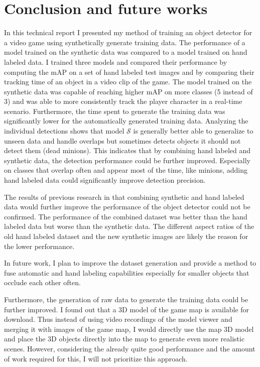 \section{Conclusion and future works}
In this technical report I presented my method of training an object detector for a video game using synthetically generate training data.
The performance of a model trained on the synthetic data was compared to a model trained on hand labeled data.
I trained three models and compared their performance by computing the mAP on a set of hand labeled test images and by comparing their tracking time of an object in a video clip of the game.
The model trained on the synthetic data was capable of reaching higher mAP on more classes (5 instead of 3) and was able to more consistently track the player character in a real-time scenario.
Furthermore, the time spent to generate the training data was significantly lower for the automatically generated training data.
Analyzing the individual detections shows that model $\mathcal{S}$ is generally better able to generalize to unseen data and handle overlaps but sometimes detects objects it should not detect them (dead minions).
This indicates that by combining hand labeled and synthetic data, the detection performance could be further improved.
Especially on classes that overlap often and appear most of the time, like minions, adding hand labeled data could significantly improve detection precision.

The results of previous research in \cite{rajpura2017object} that combining synthetic and hand labeled data would further improve the performance of the object detector could not be confirmed. The performance of the combined dataset was better than the hand labeled data but worse than the synthetic data. The different aspect ratios of the old hand labeled dataset and the new synthetic images are likely the reason for the lower performance.

In future work, I plan to improve the dataset generation and provide a method to fuse automatic and hand labeling capabilities especially for smaller objects that occlude each other often.


Furthermore, the generation of raw data to generate the training data could be further improved.
I found out that a 3D model of the game map is available for download.
Thus instead of using video recordings of the model viewer and merging it with images of the game map, I would directly use the map 3D model and place the 3D objects directly into the map to generate even more realistic scenes.
However, considering the already quite good performance and the amount of work required for this, I will not prioritize this approach.